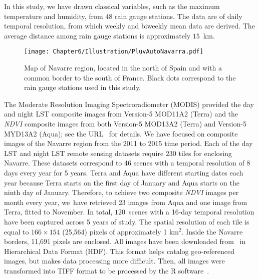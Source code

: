 In this study, we have drawn classical variables, such as the maximum temperature and humidity, from 48 rain gauge
stations. The data are of daily temporal resolution, from which weekly and biweekly mean data are derived.
The average distance among rain gauge stations is approximately $15$~km.
\begin{figure}[ht]
 \centering
  \texttt{[image: Chapter6/Illustration/PluvAutoNavarra.pdf]}
  \vspace{-6pt}

 \caption{Map of Navarre region, located in the north of Spain and with a common border to the south of France. Black dots correspond to the rain gauge stations used in this study.}\label{navarramap}
\end{figure}
The Moderate Resolution Imaging Spectroradiometer (MODIS) provided the day and night LST composite images from Version-5 MOD11A2 (Terra) and the \emph{NDVI} composite images from both Version-5 MOD13A2 (Terra) and Version-5 MYD13A2 (Aqua); see the URL~\cite{MODIS2018} for details. We have focused on composite images of the Navarre region from the 2011 to 2015 time period. Each of the day LST and night LST
remote sensing datasets require $230$ tiles for enclosing Navarre. These datasets correspond to 46 scenes with a temporal resolution of 8 days every year for 5 years.
Terra and Aqua have different starting dates each year because Terra starts on the first day of January and Aqua starts on the ninth day of January. Therefore, to achieve two composite \emph{NDVI} images per month every year, we~have retrieved 23 images from Aqua and one image from Terra, fitted to November. In total, $120$~scenes with a 16-day temporal resolution have been captured across 5 years of study.
The spatial resolution of each tile is equal to $166 \times 154$ (25,564) pixels of approximately 1 km$^2$.
Inside the Navarre borders, 11,691 pixels are enclosed.
All images have been downloaded from~\cite{earthexplorer2012} in Hierarchical Data Format (HDF). This format helps catalog geo-referenced images, but makes data processing more difficult. Then, all images were transformed into TIFF format to be processed by the R software~\citep{rcore2019}.


